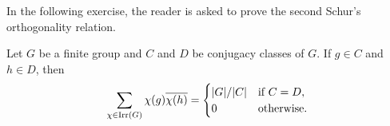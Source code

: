 
In the following exercise, the reader is asked to prove the second 
Schur's orthogonality relation. 

\begin{exercise}
    Let $G$ be a finite group and 
    $C$ and $D$ be conjugacy classes of $G$. If $g\in C$ and $h\in D$, then
    \[
    \sum_{\chi\in\operatorname{Irr}(G)}\chi(g)\overline{\chi(h)}=
    \begin{cases}
    |G|/|C| & \text{if $C=D$},\\
    0 & \text{otherwise}.
    \end{cases}
    \]
\end{exercise}

